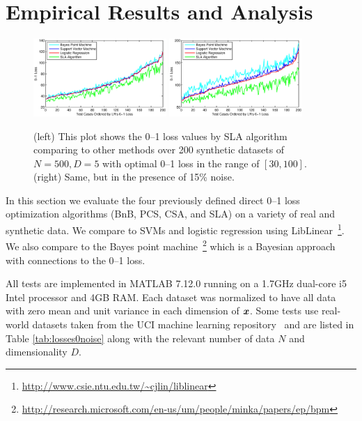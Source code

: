 \section{Empirical Results and Analysis}
\label{cha:results}

\begin{figure}[htp!]
\vspace{-1mm}
\hspace{10mm}\includegraphics[width=0.45\textwidth]{images/fig61_621a.eps}
\includegraphics[width=0.45\textwidth]{images/fig61_621b.eps}
\vspace{-2mm}
\caption{ (left) This plot shows the 0--1 loss values by SLA algorithm
  comparing to other methods over 200 synthetic datasets of $N=500,
  D=5$ with optimal 0--1 loss in the range of $[30, 100]$.  
  (right) Same, but in the presence of 15\% noise.}
\label{fig:621a}
\vspace{-2mm}
\end{figure}

In this section we evaluate the four previously defined direct 0--1
loss optimization algorithms (BnB, PCS, CSA, and SLA) on a variety of
real and synthetic data.  We compare to SVMs and logistic regression
using LibLinear~\cite{linearSVM}\footnote{
  \url{http://www.csie.ntu.edu.tw/~cjlin/liblinear}}.  We also compare
to the Bayes point machine~\cite{bpm}\footnote{
  \url{http://research.microsoft.com/en-us/um/people/minka/papers/ep/bpm}}
which is a Bayesian approach with connections to the 0--1 loss.

All tests are implemented in MATLAB 7.12.0 running on a 1.7GHz
dual-core i5 Intel processor and 4GB RAM.  Each dataset was normalized
to have all data with zero mean and unit variance in each dimension of
$\boldsymbol{x}$.  Some tests use real-world datasets taken from the UCI machine
learning repository~\cite{ucidata} and are listed in Table
\ref{tab:losses0noise} along with the relevant number of data $N$ and
dimensionality $D$.

